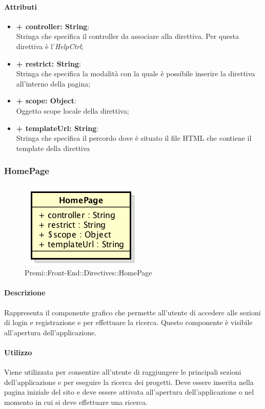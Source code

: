 	\paragraph{Attributi}
	\begin{itemize}
		\item \textbf{+ controller: String}:\\
			Stringa che specifica il controller da associare alla direttiva. Per questa direttiva è l'\textit{HelpCtrl};
		\item \textbf{+ restrict: String}:\\
			Stringa che specifica la modalità con la quale è possibile inserire la direttiva all'interno della pagina;
		\item \textbf{+ scope: Object}:\\
			Oggetto scope locale della direttiva;
		\item \textbf{+ templateUrl: String}:\\
			Stringa che specifica il percordo dove è situato il file \gls{HTML} che contiene il \gls{template} della direttiva
	\end{itemize}
\newpage


\subsubsection{HomePage}
	\begin{figure}[h]
		\centering
		\includegraphics[width=0.4\linewidth]{img/premi_front_end_directives_homepage}
		\caption[Premi::Front-End::Directives::HomePage]{Premi::Front-End::Directives::HomePage}
	\end{figure}
	
	\paragraph{Descrizione}
	Rappresenta il componente grafico che permette all'utente di accedere alle sezioni di login e registrazione e per effettuare la ricerca. Questo componente è visibile all'apertura dell'applicazione.
	
	\paragraph{Utilizzo}
	Viene utilizzata per consentire all'utente di raggiungere le principali sezioni dell'applicazione e per eseguire la ricerca dei progetti. Deve essere inserita nella pagina iniziale del sito e deve essere attivata all'apertura dell'applicazione o nel momento in cui si deve effettuare una ricerca.
		
